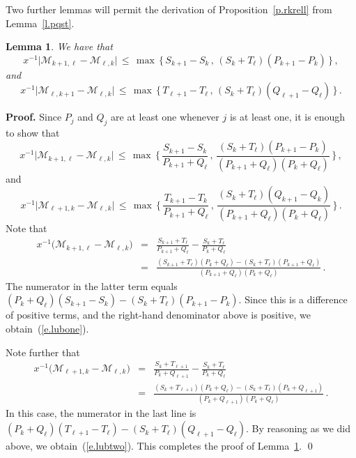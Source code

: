 \documentclass[letterpaper,11pt,oneside,reqno]{amsbook}
\numberwithin{figure}{chapter}
\newtheorem{lemma}[theorem]{Lemma}
\theoremstyle{definition}
\theoremstyle{definition}
\theoremstyle{definition}
\theoremstyle{definition}
\theoremstyle{definition}
\newcommand{\minamm}{\mathcal{M}}
\begin{document}
Two further lemmas will permit the derivation of Proposition~\ref{p.rkrell} from Lemma~\ref{l.pqst}.
\begin{lemma}\label{l.lub}
We have that
$$
x^{-1} \big\vert \minamm_{k+1,\ell} - \minamm_{\ell,k} \big\vert \,
\leq \, \max \, \Big\{ \, S_{k+1} - S_k \, , \,  (S_k + T_\ell)(P_{k+1}-P_k) \, \Big\} \, ,
$$
and
$$
x^{-1} \big\vert \minamm_{\ell,k+1} - \minamm_{\ell,k} \big\vert \,
\leq \, \max \, \Big\{ \, T_{\ell+1} - T_\ell \, , \,  (S_k + T_\ell)(Q_{\ell+1}-Q_\ell) \, \Big\} \, .
$$
\end{lemma}
{\bf Proof.}
Since $P_j$ and $Q_j$ are at least one whenever $j$ is at least one, it is enough to show that
\begin{equation}\label{e.lubone}
x^{-1} \big\vert \minamm_{k+1,\ell} - \minamm_{\ell,k} \big\vert \,
\leq \, \max \, \bigg\{ \, \frac{S_{k+1} - S_k}{P_{k+1}+Q_\ell} \, , \,  \frac{(S_k + T_\ell)(P_{k+1}-P_k)}{(P_{k+1}+Q_\ell)(P_k+Q_\ell)} \, \bigg\} \, ,
\end{equation}
and 
\begin{equation}\label{e.lubtwo}
x^{-1} \big\vert \minamm_{\ell+1,k} - \minamm_{\ell,k} \big\vert \,
\leq \, \max \, \bigg\{ \, \frac{T_{k+1} - T_k}{P_{k+1}+Q_\ell} \, , \,  \frac{(S_k + T_\ell)(Q_{k+1}-Q_k)}{(P_{k+1}+Q_\ell)(P_k+Q_\ell)} \, \bigg\} \, .
\end{equation}
 Note that
\begin{eqnarray}
 x^{-1} \big( \minamm_{k+1,\ell} - \minamm_{\ell,k} \big) & = & \frac{S_{k+1}+T_\ell}{P_{k+1} + Q_\ell} -  \frac{S_k+T_\ell}{ P_k + Q_\ell} \nonumber \\
  & = & \frac{(S_{k+1} + T_\ell)(P_k + Q_\ell)  - (S_k + T_\ell)(P_{k+1} + Q_\ell)}{(P_{k+1} + Q_\ell)(P_k + Q_\ell)} \, . \nonumber
\end{eqnarray}
The numerator in the latter term equals $ (P_k + Q_\ell) (S_{k+1} - S_k)  - (S_k+T_\ell)(P_{k+1} - P_k)$. Since this is 
 a difference of positive terms, and the right-hand denominator above is positive, we obtain~(\ref{e.lubone}).

Note further that
\begin{eqnarray}
 x^{-1} \big( \minamm_{\ell+1,k} - \minamm_{\ell,k} \big) & = & \frac{S_k+T_{\ell+1}}{P_k+ Q_{\ell+1}} -  \frac{S_k+T_\ell}{ P_k + Q_\ell} \nonumber \\
  & = & \frac{(S_k + T_{\ell+1})(P_k + Q_\ell)  - (S_k + T_\ell)(P_k + Q_{\ell+1})}{(P_k + Q_{\ell+1})(P_k + Q_\ell)} \, . \nonumber
\end{eqnarray}
In this case, the numerator in the last line is $(P_k + Q_\ell) (T_{\ell+1} - T_\ell)  - (S_k+T_\ell)(Q_{\ell+1} - Q_\ell)$.
By reasoning as we did above,
 we obtain~(\ref{e.lubtwo}). This completes the proof of Lemma~\ref{l.lub}. \qed
\end{document}
